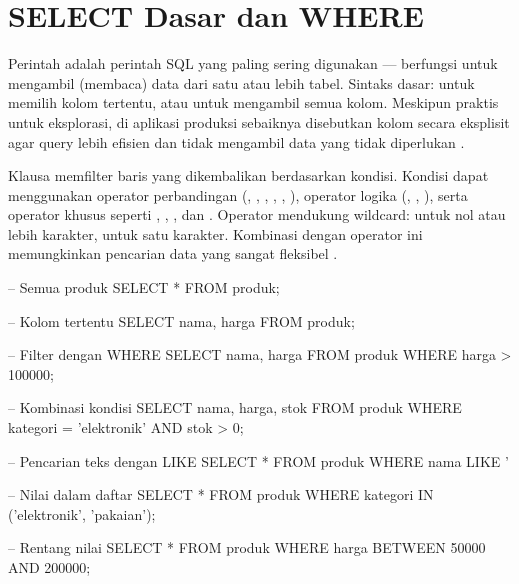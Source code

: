 \section{SELECT Dasar dan WHERE}

Perintah  adalah perintah SQL yang paling sering digunakan --- berfungsi untuk mengambil (membaca) data dari satu atau lebih tabel. Sintaks dasar:  untuk memilih kolom tertentu, atau  untuk mengambil semua kolom. Meskipun  praktis untuk eksplorasi, di aplikasi produksi sebaiknya disebutkan kolom secara eksplisit agar query lebih efisien dan tidak mengambil data yang tidak diperlukan \cite{mysqlDocs}.

Klausa  memfilter baris yang dikembalikan berdasarkan kondisi. Kondisi dapat menggunakan operator perbandingan (\code{=}, \code{<>}, \code{<}, \code{>}, \code{<=}, \code{>=}), operator logika (, , ), serta operator khusus seperti , , , dan . Operator  mendukung wildcard: \code{\%} untuk nol atau lebih karakter, \code{\_} untuk satu karakter. Kombinasi  dengan operator ini memungkinkan pencarian data yang sangat fleksibel \cite{mysqlGettingStarted}.

\begin{webcode}[language=SQL, caption={Contoh SELECT dengan WHERE}]
-- Semua produk
SELECT * FROM produk;

-- Kolom tertentu
SELECT nama, harga FROM produk;

-- Filter dengan WHERE
SELECT nama, harga FROM produk WHERE harga > 100000;

-- Kombinasi kondisi
SELECT nama, harga, stok FROM produk
  WHERE kategori = 'elektronik' AND stok > 0;

-- Pencarian teks dengan LIKE
SELECT * FROM produk WHERE nama LIKE '%

-- Nilai dalam daftar
SELECT * FROM produk WHERE kategori IN ('elektronik', 'pakaian');

-- Rentang nilai
SELECT * FROM produk WHERE harga BETWEEN 50000 AND 200000;
\end{webcode}

